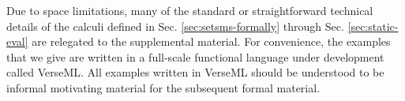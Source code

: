\documentclass[acmlarge,review,anonymous]{acmart}\settopmatter{printfolios=true}
\begin{document}
Due to space limitations, many of the standard or straightforward technical details of the calculi defined in Sec. \ref{sec:setsms-formally} through Sec. \ref{sec:static-eval} are relegated to the supplemental material. For convenience, the examples that we give are written in a full-scale functional language under development called VerseML. %
All examples written in VerseML should be understood to be informal motivating material for the subsequent formal material. %

\end{document}
